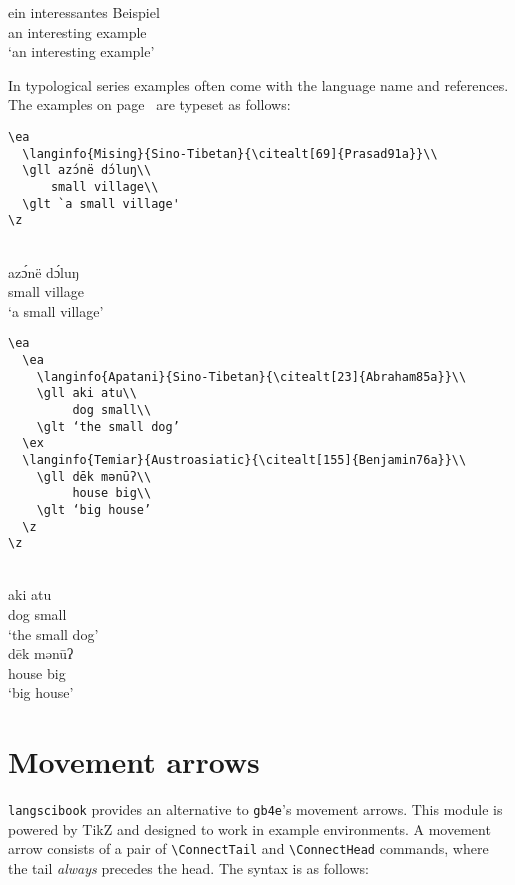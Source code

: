 \ea
\def\exfont{\normalsize\itshape}
\gll ein {\ob}interessantes       Beispiel{\cb}\\
     an  {\db}interesting example\\
\glt `an interesting example'
\z 
 


In typological series examples often come with the language name and references. The examples on
page~\pageref{ex-typology} are typeset as follows:
\begin{verbatim}
\ea
  \langinfo{Mising}{Sino-Tibetan}{\citealt[69]{Prasad91a}}\\
  \gll azɔ́në dɔ́luŋ\\
      small village\\ 
  \glt `a small village' 
\z
\end{verbatim}
\ea
  \\
  \gll azɔ́në dɔ́luŋ\\
      small village\\ 
  \glt `a small village' 
\z

\newpage

\begin{verbatim}
\ea 
  \ea
    \langinfo{Apatani}{Sino-Tibetan}{\citealt[23]{Abraham85a}}\\
    \gll aki atu\\ 
         dog small\\ 
    \glt ‘the small dog’ 
  \ex
  \langinfo{Temiar}{Austroasiatic}{\citealt[155]{Benjamin76a}}\\ 
    \gll dēk mənūʔ\\
         house big\\
    \glt ‘big house’ 
  \z
\z
\end{verbatim}

\ea 
  \ea
    \\
    \gll aki atu\\ 
	dog small\\ 
    \glt ‘the small dog’ 
  \ex
  \\ 
    \gll dēk mənūʔ\\
	house big\\
    \glt ‘big house’ 
  \z
\z

\def\exfont{\normalsize\upshape}

\section{Movement arrows}
\texttt{langscibook} provides an alternative to \texttt{gb4e}'s movement arrows. This module is powered by TikZ and designed to work in example environments. A movement arrow consists of a pair of \verb+\ConnectTail+ and \verb+\ConnectHead+ commands, where the tail \emph{always} precedes the head. The syntax is as follows:\\

